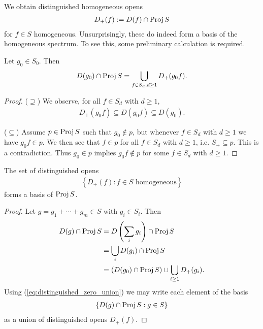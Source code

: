 \documentclass{article}
\begin{document}
We obtain distinguished homogeneous opens
\begin{align*}
  D_+(f) := D(f) \cap \operatorname{Proj} S
\end{align*}
for $f\in S$ homogeneous.
Unsurprisingly, these do indeed form a basis of the homogeneous spectrum.
To see this, some preliminary calculation is required.

\begin{lemma}
  Let $g_0\in S_0$. Then
  \begin{align}\label{eq:distinguished_zero_union}
    D(g_0) \cap \operatorname{Proj} S = \bigcup_{f\in S_d, d\geq 1} D_+(g_0f).
  \end{align}
  \begin{proof}
    ($\supseteq$) We observe, for all $f\in S_d$ with $d\geq 1$,
    \begin{align*}
      D_+(g_0f) \subseteq D(g_0 f) \subseteq D(g_0).
    \end{align*}

    ($\subseteq$) Assume $p\in\operatorname{Proj} S$ such that $g_0\not\in p$, but whenever
    $f\in S_d$ with $d\geq 1$ we have $g_0f\in p$. We then see that $f\in p$
    for all $f\in S_d$ with $d\geq 1$, i.e. $S_+\subseteq p$. This is a
    contradiction. Thus $g_0\in p$ implies $g_0 f\not\in p$
    for some $f\in S_d$ with $d\geq 1$.
  \end{proof}
\end{lemma}

\begin{proposition}
  The set of distinguished opens
  \begin{align*}
    \left\lbrace{ D_+(f) : \text{$f\in S$ homogeneous}}\right\rbrace
  \end{align*}
  forms a basis of $\operatorname{Proj} S$.
  \begin{proof}
    Let $g=g_1+\cdots+g_m\in S$ with $g_i\in S_i$. Then
    \begin{align*}
      D(g)\cap\operatorname{Proj} S
      &= D\left({\sum_i g_i}\right) \cap \operatorname{Proj} S \\
      &= \bigcup_i D(g_i) \cap\operatorname{Proj} S \\
      &= (D(g_0)\cap\operatorname{Proj} S)\cup \bigcup_{i\geq 1} D_+(g_i).
    \end{align*}
    Using (\ref{eq:distinguished_zero_union}) we may write each element
    of the basis
    \begin{align*}
      \left\lbrace{D(g) \cap \operatorname{Proj}S : g\in S}\right\rbrace
    \end{align*}
    as a union of distinguished opens $D_+(f)$.
  \end{proof}
\end{proposition}
\end{document}
